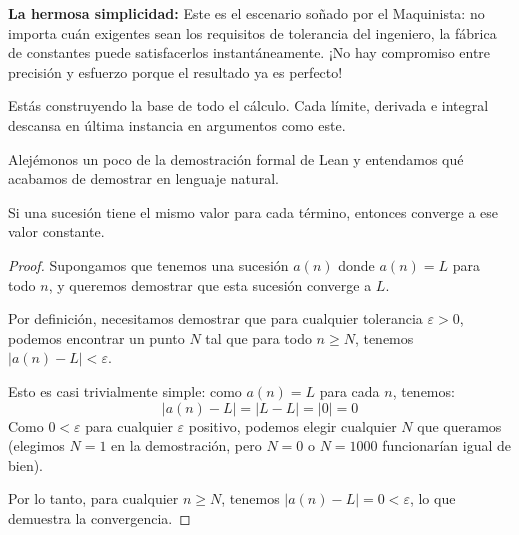 \textbf{La hermosa simplicidad:} Este es el escenario soñado por el
Maquinista: no importa cuán exigentes sean los requisitos de tolerancia
del ingeniero, la fábrica de constantes puede satisfacerlos
instantáneamente. ¡No hay compromiso entre precisión y esfuerzo porque
el resultado ya es perfecto!

Estás construyendo la base de todo el cálculo. Cada límite, derivada e
integral descansa en última instancia en argumentos como este.


Alejémonos un poco de la demostración formal de Lean y entendamos qué
acabamos de demostrar en lenguaje natural.

\begin{theorem}
  Si una sucesión tiene el mismo valor para cada término, entonces
  converge a ese valor constante.
\end{theorem}

\begin{proof}
  Supongamos que tenemos una sucesión $a(n)$ donde $a(n) = L$ para todo
  $n$, y queremos demostrar que esta sucesión converge a $L$.

  Por definición, necesitamos demostrar que para cualquier tolerancia
  $\varepsilon > 0$, podemos encontrar un punto $N$ tal que para todo
  $n \geq N$, tenemos $|a(n) - L| < \varepsilon$.

  Esto es casi trivialmente simple: como $a(n) = L$ para cada $n$,
  tenemos:
  \[ |a(n) - L| = |L - L| = |0| = 0 \]
  Como $0 < \varepsilon$ para cualquier $\varepsilon$ positivo, podemos elegir cualquier
  $N$ que queramos (elegimos $N = 1$ en la demostración, pero $N = 0$ o
  $N = 1000$ funcionarían igual de bien).

  Por lo tanto, para cualquier $n \geq N$, tenemos
  $|a(n) - L| = 0 < \varepsilon$, lo que demuestra la convergencia.
\end{proof}


